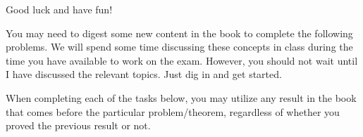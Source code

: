 \documentclass[11pt]{article}
\theoremstyle{definition}
\begin{document}
Good luck and have fun!

\newpage

You may need to digest some new content in the book to complete the following problems.  We will spend some time discussing these concepts in class during the time you have available to work on the exam. However, you should not wait until I have discussed the relevant topics.  Just dig in and get started.

\bigskip

When completing each of the tasks below, you may utilize any result in the book that comes before the particular problem/theorem, regardless of whether you proved the previous result or not.

\bigskip


\setlength{\fboxsep}{2.5pt}
\end{document}
